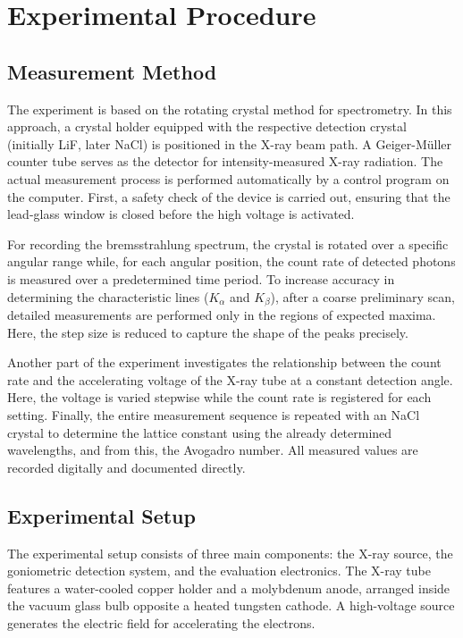 \chapter{Experimental Procedure} 
\label{ch:Durchfuehrung}

\section{Measurement Method}
\label{sec:Messverfahren}
The experiment is based on the rotating crystal method for spectrometry. In this approach, a crystal holder equipped with the respective detection crystal (initially LiF, later NaCl) is positioned in the X-ray beam path. A Geiger-Müller counter tube serves as the detector for intensity-measured X-ray radiation. The actual measurement process is performed automatically by a control program on the computer. First, a safety check of the device is carried out, ensuring that the lead-glass window is closed before the high voltage is activated.

For recording the bremsstrahlung spectrum, the crystal is rotated over a specific angular range while, for each angular position, the count rate of detected photons is measured over a predetermined time period. To increase accuracy in determining the characteristic lines ($K_\alpha$ and $K_\beta$), after a coarse preliminary scan, detailed measurements are performed only in the regions of expected maxima. Here, the step size is reduced to capture the shape of the peaks precisely.

Another part of the experiment investigates the relationship between the count rate and the accelerating voltage of the X-ray tube at a constant detection angle. Here, the voltage is varied stepwise while the count rate is registered for each setting. Finally, the entire measurement sequence is repeated with an NaCl crystal to determine the lattice constant using the already determined wavelengths, and from this, the Avogadro number. All measured values are recorded digitally and documented directly.


\section{Experimental Setup}
\label{sec:Versucshaufbau}
The experimental setup consists of three main components: the X-ray source, the goniometric detection system, and the evaluation electronics. The X-ray tube features a water-cooled copper holder and a molybdenum anode, arranged inside the vacuum glass bulb opposite a heated tungsten cathode. A high-voltage source generates the electric field for accelerating the electrons.


